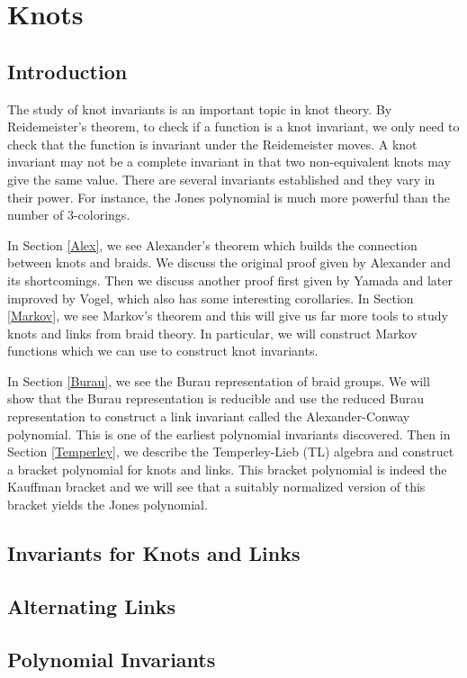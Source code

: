 \chapter{Knots}

\section{Introduction}

The study of knot invariants is an important topic in knot theory. By Reidemeister's theorem, to check if a function is a knot invariant, we only need to check that the function is invariant under the Reidemeister moves. A knot invariant may not be a complete invariant in that two non-equivalent knots may give the same value. There are several invariants established and they vary in their power. For instance, the Jones polynomial is much more powerful than the number of $3$-colorings.

In Section \ref{Alex}, we see Alexander's theorem which builds the connection between knots and braids. We discuss the original proof given by Alexander and its shortcomings. Then we discuss another proof first given by Yamada and later improved by Vogel, which also has some interesting corollaries. In Section \ref{Markov}, we see Markov's theorem and this will give us far more tools to study knots and links from braid theory. In particular, we will construct Markov functions which we can use to construct knot invariants.

In Section \ref{Burau}, we see the Burau representation of braid groups. We will show that the Burau representation is reducible and use the reduced Burau representation to construct a link invariant called the Alexander-Conway polynomial. This is one of the earliest polynomial invariants discovered. Then in Section \ref{Temperley}, we describe the Temperley-Lieb (TL) algebra and construct a bracket polynomial for knots and links. This bracket polynomial is indeed the Kauffman bracket and we will see that a suitably normalized version of this bracket yields the Jones polynomial.

\section{Invariants for Knots and Links}

\section{Alternating Links}

\section{Polynomial Invariants}
